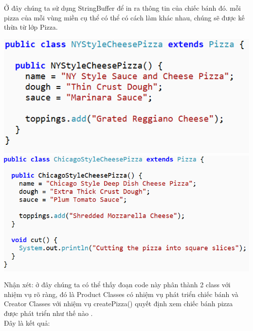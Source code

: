 Ở đây chúng ta sử dụng StringBuffer để in ra thông tin của chiếc bánh đó.
mỗi pizza của mỗi vùng miền cụ thể có thể có cách làm khác nhau, chúng sẽ được kế thừa từ lớp Pizza.

\begin{multicols}{2}
	\includegraphics[width=1\columnwidth]{GALLEYS/images/chapter5/images6}
	\includegraphics[width=1\columnwidth]{GALLEYS/images/chapter5/images7}
\end{multicols}
Nhận xét: ở đây chúng ta có thể thấy đoạn code này phân thành 2 class với nhiệm vụ rõ ràng, đó là Product Classes có nhiệm vụ phát triển chiếc bánh và Creator Classes với nhiệm vụ createPizza() quyết định xem chiếc bánh pizza được phát triển như thế nào .\\
Đây là kết quả:

